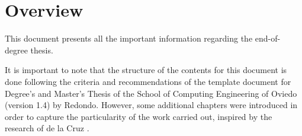 \renewcommand{\documentname}{Overview}

\chapter{Overview}

This document presents all the important information regarding the \textit{\tfg} end-of-degree thesis.

It is important to note that the structure of the contents for this document is done following the criteria and recommendations of the template document for Degree's and Master's Thesis of the School of Computing Engineering of Oviedo (version 1.4) \cite{redondotemplate} by Redondo. However, some additional chapters were introduced in order to capture the particularity of the work carried out, inspired by the research of de la Cruz \cite{delacruz18metaheuristics}.

